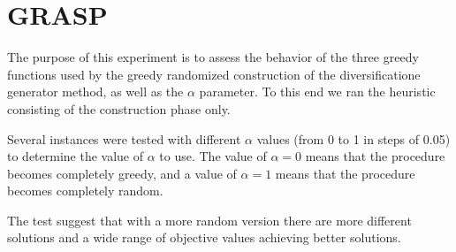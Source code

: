 \section{GRASP}
The purpose of this experiment
is to assess the behavior of the three greedy functions
used by the greedy randomized construction
of the diversificatione generator method,
as well as the $\alpha$ parameter.
To this end
we ran the heuristic consisting of
the construction phase only.

Several instances were tested
with different $\alpha$ values
(from 0 to 1 in steps of 0.05)
to determine the value of $\alpha$ to use.
The value of $\alpha = 0$ means that
the procedure becomes completely greedy,
and a value of $\alpha = 1$ means that
the procedure becomes completely random.

The test suggest
that
with a more random version
there are more different solutions
and a wide range of objective values
achieving better solutions.
